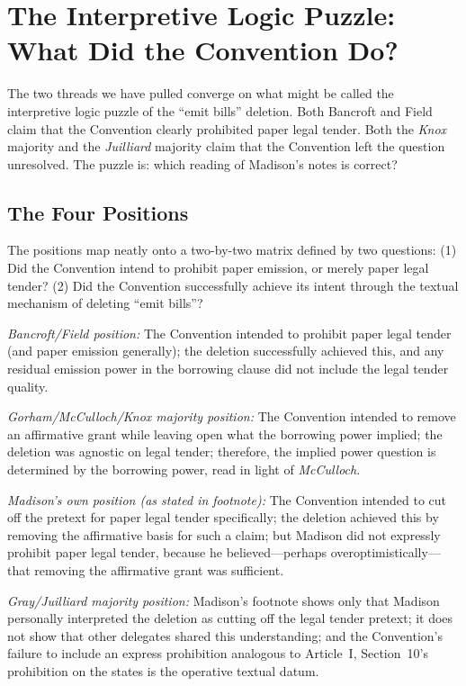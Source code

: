 \documentclass[12pt]{article}
\begin{document}
\section{The Interpretive Logic Puzzle: What Did the Convention Do?}

The two threads we have pulled converge on what might be called the
interpretive logic puzzle of the ``emit bills'' deletion. Both Bancroft
and Field claim that the Convention clearly prohibited paper legal
tender. Both the \textit{Knox} majority and the \textit{Juilliard}
majority claim that the Convention left the question unresolved. The
puzzle is: which reading of Madison's notes is correct?

\subsection{The Four Positions}

The positions map neatly onto a two-by-two matrix defined by two
questions: (1) Did the Convention intend to prohibit paper emission,
or merely paper legal tender? (2) Did the Convention successfully
achieve its intent through the textual mechanism of deleting ``emit
bills''?

\textit{Bancroft/Field position:} The Convention intended to prohibit
paper legal tender (and paper emission generally); the deletion
successfully achieved this, and any residual emission power in the
borrowing clause did not include the legal tender quality.

\textit{Gorham/McCulloch/Knox majority position:} The Convention
intended to remove an affirmative grant while leaving open what the
borrowing power implied; the deletion was agnostic on legal tender;
therefore, the implied power question is determined by the borrowing
power, read in light of \textit{McCulloch}.

\textit{Madison's own position (as stated in footnote):} The
Convention intended to cut off the pretext for paper legal tender
specifically; the deletion achieved this by removing the affirmative
basis for such a claim; but Madison did not expressly prohibit paper
legal tender, because he believed---perhaps overoptimistically---that
removing the affirmative grant was sufficient.

\textit{Gray/Juilliard majority position:} Madison's footnote shows
only that Madison personally interpreted the deletion as cutting off
the legal tender pretext; it does not show that other delegates shared
this understanding; and the Convention's failure to include an express
prohibition analogous to Article~I, Section~10's prohibition on the
states is the operative textual datum.
\end{document}

